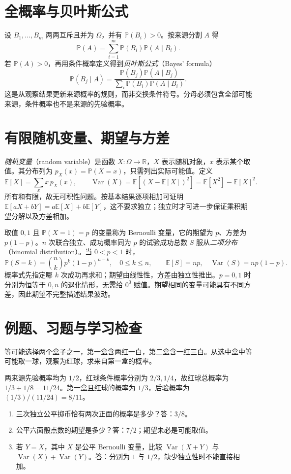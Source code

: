 \section{全概率与贝叶斯公式}
设 $B_1,\ldots,B_m$ 两两互斥且并为 $\Omega$，并有 $\mathbb P(B_i)>0$。按来源分割 $A$ 得
\begin{equation}\label{eq:em-total-probability}
 \mathbb P(A)=\sum_{i=1}^m\mathbb P(B_i)\mathbb P(A\mid B_i).
\end{equation}
若 $\mathbb P(A)>0$，再用条件概率定义得到\emph{贝叶斯公式}（Bayes' formula）
\[
 \mathbb P(B_j\mid A)=
 \frac{\mathbb P(B_j)\mathbb P(A\mid B_j)}
 {\sum_i\mathbb P(B_i)\mathbb P(A\mid B_i)}.
\]
这是从观察结果更新来源概率的规则，而非交换条件符号。分母必须包含全部可能来源，条件概率也不是来源的先验概率。

\section{有限随机变量、期望与方差}
\emph{随机变量}（random variable）是函数 $X:\Omega\to\mathbb R$，$X$ 表示随机对象，$x$ 表示某个取值。其分布列为 $p_X(x)=\mathbb P(X=x)$，只需列出实际可能值。定义
\[
 \mathbb E[X]=\sum_x x\,p_X(x),\qquad
 \operatorname{Var}(X)=\mathbb E[(X-\mathbb E[X])^2]
 =\mathbb E[X^2]-\mathbb E[X]^2.
\]
所有和有限，故无可积性问题。按基本结果逐项相加可证明 $\mathbb E[aX+bY]=a\mathbb E[X]+b\mathbb E[Y]$，这不要求独立；独立时才可进一步保证乘积期望分解以及方差相加。

取值 $0,1$ 且 $\mathbb P(X=1)=p$ 的变量称为 Bernoulli 变量，它的期望为 $p$、方差为 $p(1-p)$。$n$ 次联合独立、成功概率同为 $p$ 的试验成功总数 $S$ 服从\emph{二项分布}（binomial distribution）。当 $0<p<1$ 时，
\[
 \mathbb P(S=k)=\binom nk p^k(1-p)^{n-k},\quad 0\le k\le n,
 \qquad \mathbb E[S]=np,\quad\operatorname{Var}(S)=np(1-p).
\]
概率式先指定哪 $k$ 次成功再求和；期望由线性性，方差由独立性推出。$p=0,1$ 时分别为恒等于 $0,n$ 的退化情形，无需给 $0^0$ 赋值。期望相同的变量可能具有不同方差，因此期望不完整描述结果波动。

\section{例题、习题与学习检查}
\begin{example}
等可能选择两个盒子之一，第一盒含两红一白，第二盒含一红三白。从选中盒中等可能取一球，观察为红球，求来自第一盒的概率。
\end{example}
\begin{solve}
两来源先验概率均为 $1/2$，红球条件概率分别为 $2/3,1/4$，故红球总概率为 $1/3+1/8=11/24$。第一盒且红球的概率为 $1/3$，后验概率为 $(1/3)/(11/24)=8/11$。
\end{solve}
\begin{enumerate}
\item 三次独立公平掷币恰有两次正面的概率是多少？答：$3/8$。
\item 公平六面骰点数的期望是多少？答：$7/2$；期望未必是可能取值。
\item 若 $Y=X$，其中 $X$ 是公平 Bernoulli 变量，比较 $\operatorname{Var}(X+Y)$ 与 $\operatorname{Var}(X)+\operatorname{Var}(Y)$。答：分别为 $1$ 与 $1/2$，缺少独立性时不能直接相加。
\end{enumerate}

